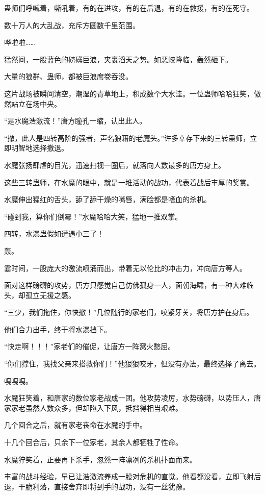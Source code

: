 \begin{this_body}
蛊师们呼喊着，嘶吼着，有的在进攻，有的在后退，有的在救援，有的在死守。

数十万人的大乱战，充斥方圆数千里范围。

哗啦啦……

猛然间，一股蓝色的磅礴巨浪，夹裹滔天之势。如恶蛟降临，轰然砸下。

大量的狼群、蛊师，都被巨浪席卷吞没。

这片战场被瞬间清空，潮湿的青草地上，积成数个大水洼。一位蛊师哈哈狂笑，傲然站立在场中央。

“是水魔浩激流！”唐方瞳孔一缩，认出此人。

“撤，此人是四转高阶的强者，声名狼藉的老魔头。”许多幸存下来的三转蛊师，立即明智地选择撤退。

水魔张扬肆虐的目光，迅速扫视一圈后，就落向人数最多的唐方身上。

这些三转蛊师，在水魔的眼中，就是一堆活动的战功，代表着战后丰厚的奖赏。

水魔伸出猩红的舌头，舔了舔干燥的嘴唇，满脸都是嗜血的杀机。

“碰到我，算你们倒霉！”水魔哈哈大笑，猛地一推双掌。

四转，水瀑蛊假如遭遇小三了！

轰。

霎时间，一股庞大的激流喷涌而出，带着无以伦比的冲击力，冲向唐方等人。

面对这样磅礴的攻势，唐方只感觉自己仿佛孤身一人，面朝海啸，有一种大难临头，却孤立无援之感。

“三少，我们拖住，你快撤！”几位随行的家老们，咬紧牙关，将唐方护在身后。

他们合力出手，终于将水瀑挡下。

“快走啊！！！”家老们的催促，让唐方一阵窝火憋屈。

“你们撑住，我找父亲来搭救你们！”他狠狠咬牙，但没有办法，最终选择了离去。

嘎嘎嘎。

水魔狂笑着，和唐家的数位家老战成一团。他攻势凌厉，水势磅礴，以势压人，唐家家老虽然人数众多，但却陷入下风，抵挡得相当艰难。

几个回合之后，就有家老丧命在水魔的手中。

十几个回合后，只余下一位家老，其余人都牺牲了性命。

水魔狞笑着，正要再下杀手，忽然一阵凛冽的杀机扑面而来。

丰富的战斗经验，早已让浩激流养成一股对危机的直觉。他看都没看，立即飞射后退，干脆利落，直接舍弃即将到手的战功，没有一丝犹豫。


\end{this_body}
